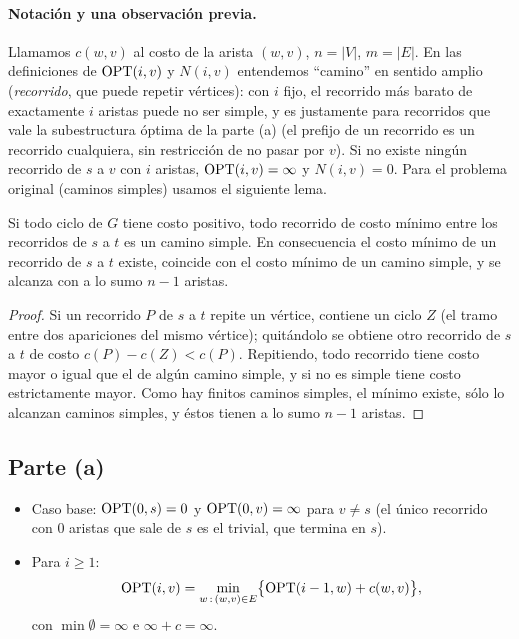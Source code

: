 \paragraph{Notación y una observación previa.} Llamamos $c(w,v)$ al costo de la arista $(w,v)$, $n=|V|$,
$m=|E|$. En las definiciones de $\mathrm{OPT}(i,v)$ y $N(i,v)$ entendemos ``camino'' en sentido amplio
(\emph{recorrido}, que puede repetir vértices): con $i$ fijo, el recorrido más barato de exactamente $i$
aristas puede no ser simple, y es justamente para recorridos que vale la subestructura óptima de la parte (a)
(el prefijo de un recorrido es un recorrido cualquiera, sin restricción de no pasar por $v$). Si no existe
ningún recorrido de $s$ a $v$ con $i$ aristas, $\mathrm{OPT}(i,v)=\infty$ y $N(i,v)=0$. Para el problema original
(caminos simples) usamos el siguiente lema.

\begin{lema}\label{lema:simple}
Si todo ciclo de $G$ tiene costo positivo, todo recorrido de costo mínimo entre los recorridos de $s$ a $t$
es un camino simple. En consecuencia el costo mínimo de un recorrido de $s$ a $t$ existe, coincide con el
costo mínimo de un camino simple, y se alcanza con a lo sumo $n-1$ aristas.
\end{lema}
\begin{proof}
Si un recorrido $P$ de $s$ a $t$ repite un vértice, contiene un ciclo $Z$ (el tramo entre dos apariciones
del mismo vértice); quitándolo se obtiene otro recorrido de $s$ a $t$ de costo $c(P)-c(Z)<c(P)$. Repitiendo,
todo recorrido tiene costo mayor o igual que el de algún camino simple, y si no es simple tiene costo
estrictamente mayor. Como hay finitos caminos simples, el mínimo existe, sólo lo alcanzan caminos simples, y
éstos tienen a lo sumo $n-1$ aristas.
\end{proof}

\subsection*{Parte (a)}

\begin{itemize}
\item Caso base: $\mathrm{OPT}(0,s)=0$ y $\mathrm{OPT}(0,v)=\infty$ para $v\neq s$ (el único recorrido con 0 aristas que
  sale de $s$ es el trivial, que termina en $s$).
\item Para $i\ge1$:
\[
\mathrm{OPT}(i,v) = \min_{w\,:\,(w,v)\in E}\bigl\{\mathrm{OPT}(i-1,w)+c(w,v)\bigr\},
\]
con $\min\emptyset=\infty$ e $\infty+c=\infty$.
\end{itemize}

